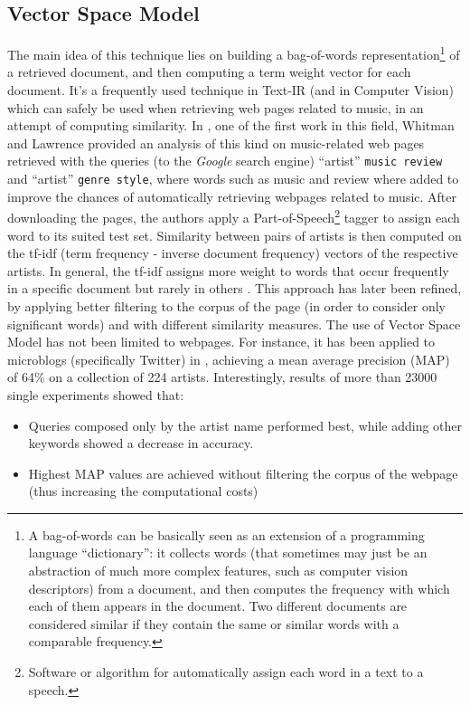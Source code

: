 \subsection{Vector Space Model} 
The main idea of this technique lies on building a bag-of-words representation\footnote{A bag-of-words can be basically seen as an extension of a programming language ``dictionary'': it collects words (that sometimes may just be an abstraction of much more complex features, such as computer vision descriptors) from a document, and then computes the frequency with which each of them appears in the document. Two different documents are considered similar if they contain the same or similar words with a comparable frequency.} of a retrieved document, and then computing a term weight vector for each document. It's a frequently used technique in Text-IR (and in Computer Vision) which can safely be used when retrieving web pages related to music, in an attempt of computing similarity. In \cite{whitman02}, one of the first work in this field, Whitman and Lawrence provided an analysis of this kind on music-related web pages retrieved with the queries (to the \textit{Google} search engine) ``artist'' \texttt{music review} and ``artist'' \texttt{genre style}, where words such as music and review where added to improve the chances of automatically retrieving webpages related to music. After downloading the pages, the authors apply a Part-of-Speech\footnote{Software or algorithm for automatically assign each word in a text to a speech.} tagger to assign each word to its suited test set. Similarity between pairs of artists is then computed on the tf-idf (term frequency - inverse document frequency) vectors of the respective artists. In general, the tf-idf assigns more weight to words that occur frequently in a specific document but rarely in others \cite{musicdatamining}. This approach has later been refined, by applying better filtering to the corpus of the page (in order to consider only significant words) and with different similarity measures. The use of Vector Space Model has not been limited to webpages. For instance, it has been applied to microblogs (specifically Twitter) in \cite{schedl12}, achieving a mean average precision (MAP) of 64\% on a collection of 224 artists. Interestingly, results of more than 23000 single experiments showed that:
\begin{itemize}
\item Queries composed only by the artist name performed best, while adding other keywords showed a decrease in accuracy.
\item Highest MAP values are achieved without filtering the corpus of the webpage (thus increasing the computational costs)
\end{itemize}
